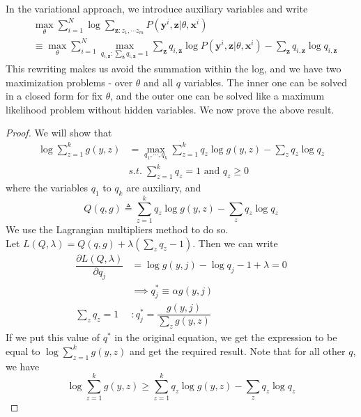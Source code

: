 In the variational approach, we introduce auxiliary variables and write
\begin{equation}
\begin{split}
&\max_\theta \sum_{i=1}^N \log \sum_{\mathbf z:z_1, \cdots z_m}P(\mathbf y^i, \mathbf z | \theta, \mathbf x^i) \\
&\equiv \max_\theta\sum_{i=1}^N \max_{q_{i,\mathbf z}:\sum_{\mathbf z} q_{i, \mathbf z} = 1} \sum_{\mathbf z} q_{i, \mathbf z} \log P(\mathbf y^i, \mathbf z | \theta, \mathbf x^i) - \sum_{\mathbf z} q_{i, \mathbf z} \log q_{i, \mathbf z}
\end{split}
\end{equation}
This rewriting makes us avoid the summation within the log, and we have two maximization problems - over $\theta$ and all $q$ variables. The inner one can be solved in a closed form for fix $\theta$, and the outer one can be solved like a maximum likelihood problem without hidden variables. We now prove the above result. \\
\begin{proof}
We will show that
\begin{equation}
\begin{split}
\log\sum_{z=1}^k g(y,z) &= \max_{q_1, \cdots, q_k} \sum_{z=1}^k q_z\log g(y,z) - \sum_z q_z\log q_z \\
&s.t. \; \sum_{z=1}^k q_z = 1 \text{ and } q_z \geq 0
\end{split}
\end{equation}
where the variables $q_1$ to $q_k$ are auxiliary, and
\begin{equation}
	Q(q, g) \triangleq \sum_{z=1}^k q_z \log g(y,z) - \sum_z q_z \log q_z
\end{equation}
We use the Lagrangian multipliers method to do so. \\
Let $L(Q,\lambda) = Q(q, g) + \lambda(\sum_z q_z - 1)$. Then we can write
\begin{align*}
\dfrac{\partial L(Q, \lambda)}{\partial q_j} &= \log g(y, j) - \log q_j - 1 + \lambda = 0 \\
&\implies q^*_j \equiv \alpha g(y,j) \\
\sum_z q_z = 1 &: q_j^* = \dfrac{g(y,j)}{\sum_z g(y,z)}
\end{align*}
If we put this value of $q^*$ in the original equation, we get the expression to be equal to $\log\sum_{z=1}^k g(y,z)$ and get the required result. Note that for all other $q$, we have
\[\log\sum_{z=1}^k g(y,z) \geq \sum_{z=1}^k q_z\log g(y,z) - \sum_z q_z\log q_z\]
\end{proof}
